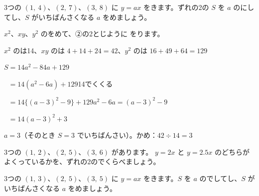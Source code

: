 \begin{reidai}
3つの $(1,\ 4)$、$(2,\ 7)$、$(3,\ 8)$ に $y=ax$ をきます。ずれの2の $S$ を $a$ のにしてし、$S$ がいちばんさくなる $a$ をめましょう。\par
\kangaekata $x^2$、$xy$、$y^2$ のをめて、②の2とじように
をります。\par
\shiki $x^2$ のは14、$xy$ のは $4+14+24=42$、$y^2$ のは $16+49+64=129$\par
\hspace*{2.6\zw}$S=14a^2-84a+129$\par
\hspace*{2.6\zw}$\phantom{S}=14(a^2-6a)+129$\quad 14でくくる\par
\hspace*{2.6\zw}$\phantom{S}=14\{(a-3)^2-9\}+129$\quad $a^2-6a=(a-3)^2-9$\par
\hspace*{2.6\zw}$\phantom{S}=14(a-3)^2+3$\par
\kotae $a=3$（そのとき $S=3$ でいちばんさい）。かめ：$42\div14=3$
\end{reidai}

\begingroup{}%
\noindent\begin{minipage}[t]{0.49\linewidth}
\begin{jibun}
3つの $(1,\ 2)$、$(2,\ 5)$、$(3,\ 6)$ があります。 $y=2x$ と $y=2.5x$ のどちらがよくっているかを、ずれの2のでくらべましょう。
\end{jibun}
\end{minipage}\hfill
\begin{minipage}[t]{0.49\linewidth}
\begin{jibun}
3つの $(1,\ 3)$、$(2,\ 5)$、$(3,\ 5)$ に $y=ax$ をきます。$S$ を $a$ のでしてし、$S$ がいちばんさくなる $a$ をめましょう。
\end{jibun}
\end{minipage}\par
\endgroup


